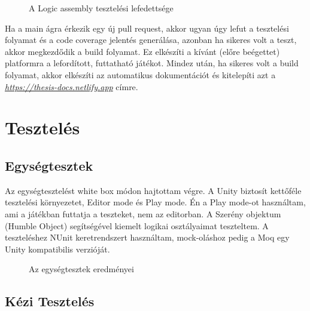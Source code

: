 \begin{figure}[H]
	\noindent{}
	\caption{A Logic assembly tesztelési lefedettsége}
	\label{codeCoverage}
\end{figure}

Ha a main ágra érkezik egy új pull request, akkor ugyan úgy lefut a tesztelési folyamat és a code coverage jelentés generálása, azonban ha sikeres volt a teszt, akkor megkezdődik a build folyamat. Ez elkészíti a kívánt (előre beégettet) platformra a lefordított, futtatható játékot. Mindez után, ha sikeres volt a build folyamat, akkor elkészíti az automatikus dokumentációt és kitelepíti azt a \textit{\url{https://thesis-docs.netlify.app}} címre.

\cleardoublepage
\section{Tesztelés}

\subsection{Egységtesztek}
Az egységtesztelést white box módon hajtottam végre. A Unity biztosít kettőféle tesztelési környezetet, Editor mode és Play mode. Én a Play mode-ot használtam, ami a játékban futtatja a teszteket, nem az editorban. A Szerény objektum (Humble Object) segítségével kiemelt logikai osztályaimat teszteltem. A teszteléshez NUnit keretrendszert használtam, mock-oláshoz pedig a Moq egy Unity kompatibilis verzióját.

\begin{figure}[H]
	\noindent{}
	\caption{Az egységtesztek eredményei}
	\label{tests}
\end{figure}

\subsection{Kézi Tesztelés}

